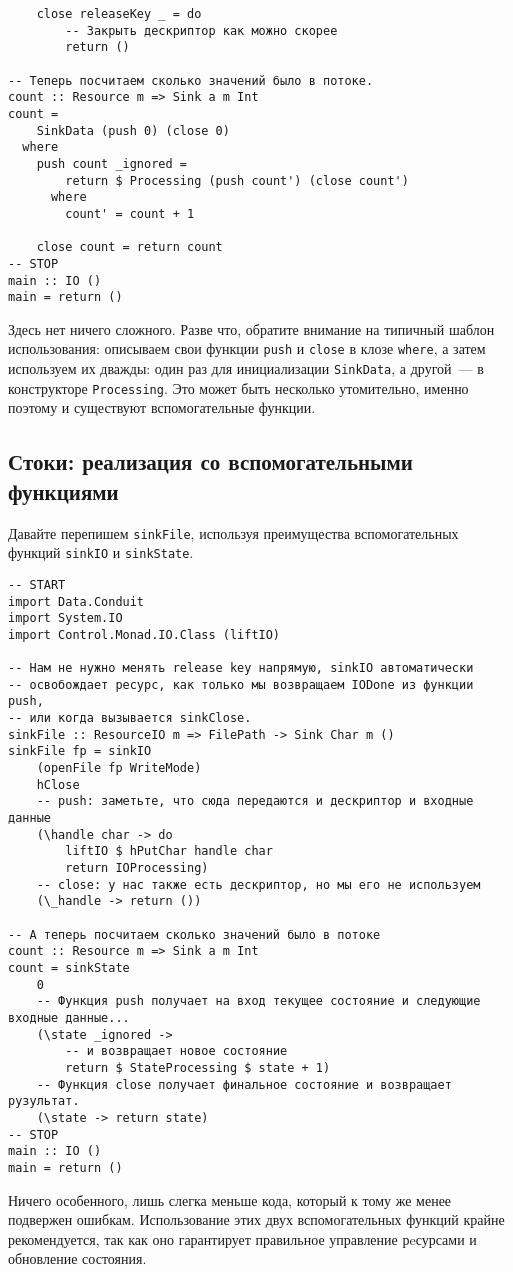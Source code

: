 {\begin{lstlisting}
    close releaseKey _ = do
        -- Закрыть дескриптор как можно скорее
        return ()

-- Теперь посчитаем сколько значений было в потоке.
count :: Resource m => Sink a m Int
count =
    SinkData (push 0) (close 0)
  where
    push count _ignored =
        return $ Processing (push count') (close count')
      where
        count' = count + 1

    close count = return count
-- STOP
main :: IO ()
main = return ()
\end{lstlisting}
Здесь нет ничего сложного. Разве что, обратите внимание на типичный шаблон использования:
описываем свои функции \lstinline'push' и \lstinline'close' в клозе \lstinline'where', а
затем используем их дважды:
один раз для инициализации \lstinline'SinkData', а другой~--- в конструкторе
\lstinline'Processing'. 
Это может быть несколько утомительно, именно поэтому и существуют вспомогательные функции.

\subsection{Стоки: реализация со вспомогательными функциями}
Давайте перепишем \lstinline'sinkFile', используя преимущества вспомогательных функций 
\lstinline'sinkIO' и \lstinline'sinkState'.
\begin{lstlisting}
-- START
import Data.Conduit
import System.IO
import Control.Monad.IO.Class (liftIO)

-- Нам не нужно менять release key напрямую, sinkIO автоматически
-- освобождает ресурс, как только мы возвращаем IODone из функции push,
-- или когда вызывается sinkClose.
sinkFile :: ResourceIO m => FilePath -> Sink Char m ()
sinkFile fp = sinkIO
    (openFile fp WriteMode)
    hClose
    -- push: заметьте, что сюда передаются и дескриптор и входные данные
    (\handle char -> do
        liftIO $ hPutChar handle char
        return IOProcessing)
    -- close: у нас также есть дескриптор, но мы его не используем
    (\_handle -> return ())

-- А теперь посчитаем сколько значений было в потоке
count :: Resource m => Sink a m Int
count = sinkState
    0
    -- Функция push получает на вход текущее состояние и следующие входные данные...
    (\state _ignored ->
        -- и возвращает новое состояние
        return $ StateProcessing $ state + 1)
    -- Функция close получает финальное состояние и возвращает рузультат.
    (\state -> return state)
-- STOP
main :: IO ()
main = return ()
\end{lstlisting}
Ничего особенного, лишь слегка меньше кода, который к тому же менее подвержен ошибкам. Использование этих двух
вспомогательных  функций крайне рекомендуется, так как оно гарантирует правильное
управление рeсурсами и обновление состояния.

}
